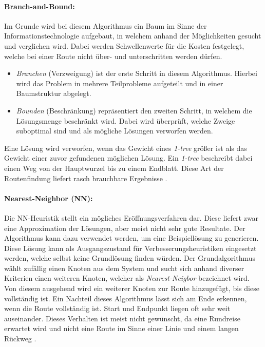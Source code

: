 \paragraph{Branch-and-Bound:}

Im Grunde wird bei diesem Algorithmus ein Baum im Sinne der Informationstechnologie aufgebaut, in welchem anhand der Möglichkeiten gesucht und verglichen wird. 
Dabei werden Schwellenwerte für die Kosten festgelegt, welche bei einer Route nicht über- und unterschritten werden dürfen.
\begin{itemize}
	\item \textit{Branchen} (Verzweigung) ist der erste Schritt in diesem Algorithmus. 
	Hierbei wird das Problem in mehrere Teilprobleme aufgeteilt und in einer Baumstruktur abgelegt. 
	\item \textit{Bounden} (Beschränkung) repräsentiert den zweiten Schritt, in welchem die Lösungsmenge beschränkt wird. 
	Dabei wird überprüft, welche Zweige suboptimal sind und als mögliche Lösungen verworfen werden. 
\end{itemize}
Eine Lösung wird verworfen, wenn das Gewicht eines \textit{1-tree} größer ist als das Gewicht einer zuvor gefundenen möglichen Lösung. 
Ein \textit{1-tree} beschreibt dabei einen Weg von der Hauptwurzel bis zu einem Endblatt. 
Diese Art der Routenfindung liefert rasch brauchbare Ergebnisse \cite{wiener2003branch}. 

\paragraph{Nearest-Neighbor (NN):}

Die NN-Heuristik stellt ein mögliches Eröffnungsverfahren dar. 
Diese liefert zwar eine Approximation der Lösungen, aber meist nicht sehr gute Resultate. 
Der Algorithmus kann dazu verwendet werden, um eine Beispiellösung zu generieren. 
Diese Lösung kann als Ausgangszustand für Verbesserungsheuristiken eingesetzt werden, welche selbst keine Grundlösung finden würden. 
Der Grundalgorithmus wählt zufällig einen Knoten aus dem System und sucht sich anhand diverser Kriterien einen weiteren Knoten, welcher als \textit{Nearest-Neigbor} bezeichnet wird. 
Von diesem ausgehend wird ein weiterer Knoten zur Route hinzugefügt, bis diese vollständig ist. 
Ein Nachteil dieses Algorithmus lässt sich am Ende erkennen, wenn die Route vollständig ist.
Start und Endpunkt liegen oft sehr weit auseinander. 
Dieses Verhalten ist meist nicht gewünscht, da eine Rundreise erwartet wird und nicht eine Route im Sinne einer Linie und einem langen Rückweg \cite{jp2010opttrans}. 

